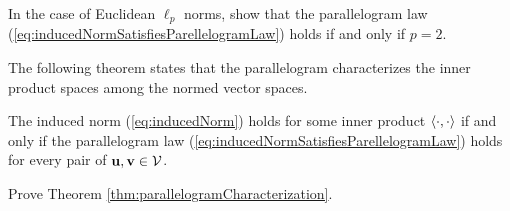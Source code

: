 \begin{exc}
  \label{exc:EuclideanPnormParallelogramLaw}
  In the case of Euclidean $\ell_p$ norms,
  show that the parallelogram law
  (\ref{eq:inducedNormSatisfiesParellelogramLaw})
  holds if and only if $p=2$.  
\end{exc}

\begin{rem}
  The following theorem states
  that the parallelogram characterizes the inner product spaces
  among the normed vector spaces.
\end{rem}

\begin{thm}
  \label{thm:parallelogramCharacterization}
  The induced norm (\ref{eq:inducedNorm}) holds
  for some inner product $\left\langle \cdot, \cdot \right\rangle$  
  if and only if the parallelogram law
  (\ref{eq:inducedNormSatisfiesParellelogramLaw})
  holds for every pair of $\mathbf{u}, \mathbf{v}\in {\cal V}$.
\end{thm}

\begin{exc}
  Prove Theorem \ref{thm:parallelogramCharacterization}.
\end{exc}

